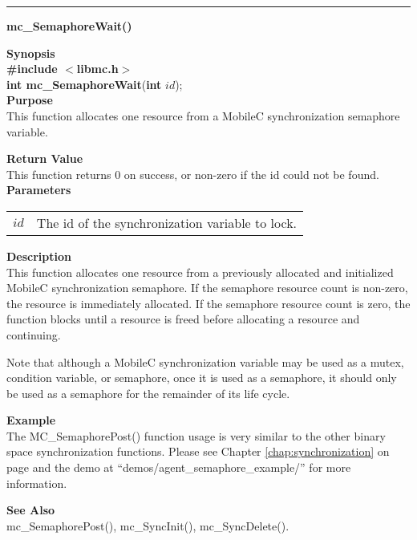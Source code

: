 \noindent
\vspace{5pt}
\rule{6.5in}{0.015in}
\noindent
{}
{\LARGE \bf mc\_SemaphoreWait()}\\

\noindent
{\bf Synopsis}\\
{\bf \#include $<$libmc.h$>$}\\
{\bf int mc\_SemaphoreWait}({\bf int} $id$);\\

\noindent
{\bf Purpose}\\
This function allocates one resource from a MobileC synchronization semaphore variable.

\noindent
{\bf Return Value}\\
This function returns 0 on success, or non-zero if the id could not be found. \\

\noindent
{\bf Parameters}
\vspace{-0.1pt}
\begin{description}
\item
\begin{tabular}{p{10 mm}p{145 mm}} 
$id$ & The id of the synchronization variable to lock. 
\end{tabular}
\end{description}

\noindent
{\bf Description}\\
This function allocates one resource from a previously allocated and initialized 
MobileC synchronization semaphore. If the semaphore resource count is non-zero, the resource is
immediately allocated. If the semaphore resource count is zero, the function blocks until a
resource is freed before allocating a resource and continuing. 

Note that although a MobileC synchronization variable may be used as a mutex, condition
variable, or semaphore, once it is used as a semaphore, it should only be used as a semaphore
for the remainder of its life cycle.

\noindent
{\bf Example}\\
The MC\_SemaphorePost() function usage is very similar to the other
binary space synchronization functions. Please see Chapter 
\ref{chap:synchronization} on page \pageref{chap:synchronization} 
and the demo at ``demos/agent\_semaphore\_example/'' for
more information.\\
\noindent

\noindent
{\bf See Also}\\
mc\_SemaphorePost(), mc\_SyncInit(), mc\_SyncDelete().\\

